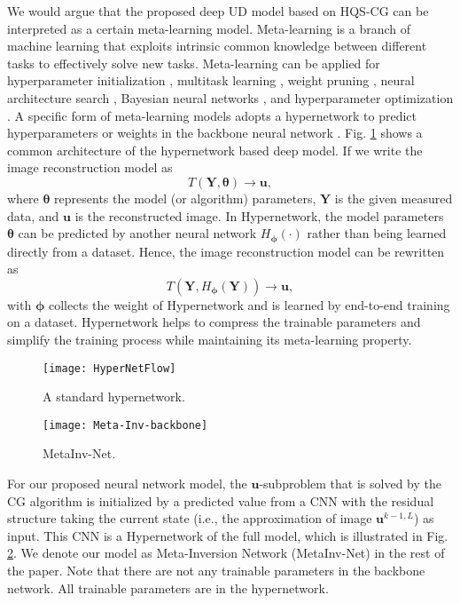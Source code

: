 \documentclass[journal,twoside]{IEEEtran}
\begin{document}
We would argue that the proposed deep UD model based on HQS-CG can be interpreted as a certain meta-learning model. Meta-learning is a branch of machine learning that exploits intrinsic common knowledge between different tasks to effectively solve new tasks. Meta-learning can be applied for hyperparameter initialization \cite{nichol2018first,finn2017model}, multitask learning \cite{Meyerson2019NIPS-MTL}, weight pruning \cite{liu2019metapruning}, neural architecture search \cite{brock2018smash,zhang2019graph}, Bayesian neural networks \cite{pawlowski2017implicit}, and hyperparameter optimization \cite{lorraine2018stochastic}. A specific form of meta-learning models adopts a hypernetwork to predict hyperparameters or weights in the backbone neural network \cite{ha2016hypernetworks}. Fig. \ref{fig:HyperNetFlow} shows a common architecture of the hypernetwork based deep model. If we write the image reconstruction model as
$$T(\bm{Y},\bm{\theta}) \to \bm{u},$$
where $\bm{\theta}$ represents the model (or algorithm) parameters, $\bm{Y}$ is the given measured data, and $\bm{u}$ is the reconstructed image. In Hypernetwork, the model parameters $\bm{\theta}$ can be predicted by another neural network $H_{\bm{\phi}}(\cdot)$ rather than being learned directly from a dataset. Hence, the image reconstruction model can be rewritten as 
$$T(\bm{Y},H_{\bm{\phi}}(\bm{Y}))\to \bm{u},$$
with $\bm{\phi}$ collects the weight of Hypernetwork and is learned by end-to-end training on a dataset. Hypernetwork helps to compress the trainable parameters and simplify the training process while maintaining its meta-learning property.

\begin{figure}[t]
\centering
\texttt{[image: HyperNetFlow]}\label{HyperNetFlow}
\caption{A standard hypernetwork.}
\label{fig:HyperNetFlow}
\end{figure}

\begin{figure}[t]
\centering
\texttt{[image: Meta-Inv-backbone]}\label{Meta-Inv-abs-flow}
\caption{MetaInv-Net.}
\label{fig:Meta-Inv-abs-flow}
\end{figure}


For our proposed neural network model, the $\bm{u}$-subproblem that is solved by the CG algorithm is initialized by a predicted value from a CNN with the residual structure taking the current state (i.e., the approximation of image $\bm{u}^{k-1,L}$) as input. This CNN is a Hypernetwork of the full model, which is illustrated in Fig. \ref{fig:Meta-Inv-abs-flow}. We denote our model as Meta-Inversion Network (MetaInv-Net) in the rest of the paper. Note that there are not any trainable parameters in the backbone network. All trainable parameters are in the hypernetwork.
\end{document}
